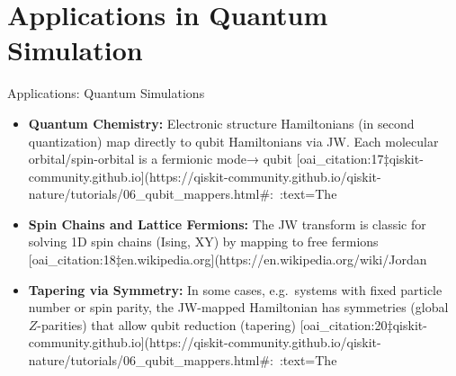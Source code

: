 \documentclass{beamer}
\begin{document}
\section{Applications in Quantum Simulation}
\begin{frame}{Applications: Quantum Simulations}
\begin{itemize}
  \item \textbf{Quantum Chemistry:} Electronic structure Hamiltonians (in second quantization) map directly to qubit Hamiltonians via JW.  Each molecular orbital/spin-orbital is a fermionic mode→ qubit [oai_citation:17‡qiskit-community.github.io](https://qiskit-community.github.io/qiskit-nature/tutorials/06_qubit_mappers.html#:~:text=The%
  \item \textbf{Spin Chains and Lattice Fermions:} The JW transform is classic for solving 1D spin chains (Ising, XY) by mapping to free fermions [oai_citation:18‡en.wikipedia.org](https://en.wikipedia.org/wiki/Jordan%
  \item \textbf{Tapering via Symmetry:} In some cases, e.g.\ systems with fixed particle number or spin parity, the JW-mapped Hamiltonian has symmetries (global $Z$-parities) that allow qubit reduction (tapering) [oai_citation:20‡qiskit-community.github.io](https://qiskit-community.github.io/qiskit-nature/tutorials/06_qubit_mappers.html#:~:text=The%
\end{itemize}
\end{frame}
\end{document}
